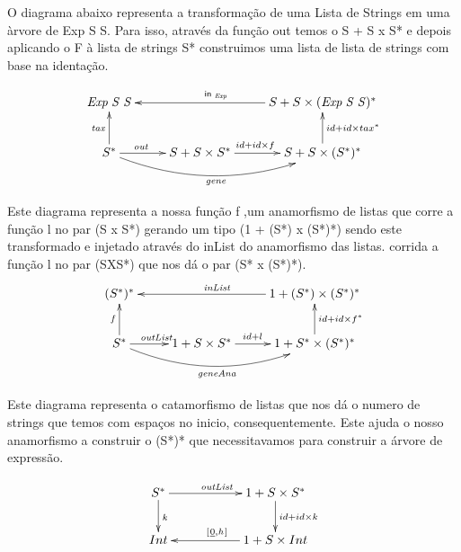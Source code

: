 \documentclass[a4paper]{article}
\newcommand{\Conid}[1]{\mathit{#1}}
\newcommand{\Varid}[1]{\mathit{#1}}
\begin{document}
O diagrama abaixo representa a transformação de uma Lista de Strings em uma àrvore de Exp S S. Para isso, através da função out temos o S + S x S* e depois aplicando o F à lista de strings S* construimos uma lista de lista de strings com base na identação.

\begin{eqnarray*}
\xymatrix{
  \ensuremath{\Conid{Exp}\;\Conid{S}\;\Conid{S}} & & S + S \times (\ensuremath{\Conid{Exp}\;\Conid{S}\;\Conid{S}})^*\ar[ll]_{\ensuremath{\mathsf{in}_{\tiny\ \textit{Exp}}}} \\
  S^*\ar@/_1.5pc/[rr]_{\ensuremath{\Varid{gene}}}\ar[r]^(0.35){\ensuremath{\Varid{out}}}\ar[u]^{\ensuremath{\Varid{tax}}} & S + S \times S^*\ar[r]^(0.45){id + id \times f} & S + S \times (S^*)^*\ar[u]_{id + id \times tax^*}
}
\end{eqnarray*}

Este diagrama representa a nossa função f ,um anamorfismo de listas que corre a função l no par (S x S*) gerando um tipo (1 + (S*) x (S*)*) sendo este transformado e injetado através do inList do anamorfismo das listas.
corrida a função  l no par (SXS*) que nos dá o par (S* x (S*)*).
\begin{eqnarray*}
\xymatrix{
  {(S^*)^*} & & 1 + (S^*) \times (S^*)^*\ar[ll]_{\ensuremath{\Varid{inList}}} \\
  S^*\ar@/_1.5pc/[rr]_{\ensuremath{\Varid{geneAna}}}\ar[r]^(0.45){\ensuremath{\Varid{outList}}}\ar[u]^{\ensuremath{\Varid{f}}} & 1 + S \times S^*\ar[r]^(0.45){id + l} & 1 + S^* \times (S^*)^*\ar[u]_{id + id \times f^*}
}
\end{eqnarray*}

Este diagrama representa o catamorfismo de listas que nos dá o numero de strings que temos com espaços no inicio, consequentemente. Este ajuda o nosso anamorfismo a construir o (S*)* que necessitavamos para construir a árvore de expressão.

\begin{eqnarray*}
\xymatrix{
  {S^*}\ar[d]^{\ensuremath{\Varid{k}}}\ar[rr]^{\ensuremath{\Varid{outList}}} & & 1 + S \times S^*\ar[d]^{id + id \times k} \\
  Int & & 1 + S \times Int\ar[ll]_{\ensuremath{[\mskip1.5mu \underline{\mathrm{0}},\Varid{h}\mskip1.5mu]}}
}
\end{eqnarray*}
\end{document}
